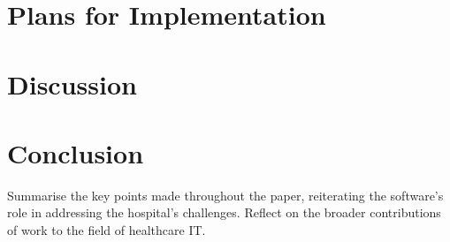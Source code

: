 \documentclass[11pt]{article}
\begin{document}

\section{Plans for Implementation}


\section{Discussion}

\section{Conclusion}
Summarise the key points made throughout the paper, reiterating the software's role in addressing the hospital's challenges.
Reflect on the broader contributions of work to the field of healthcare IT.



\end{document}
